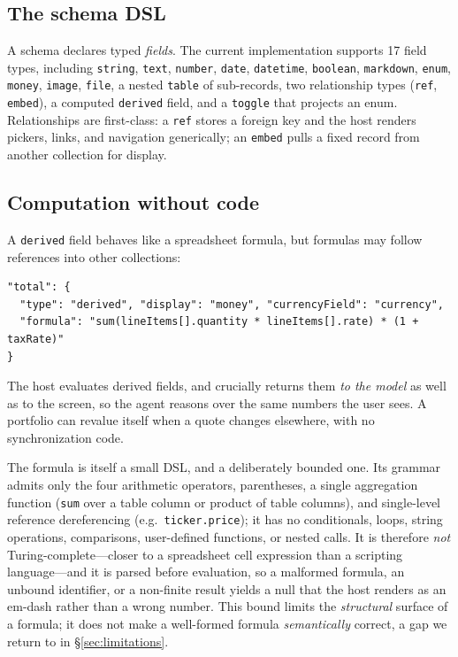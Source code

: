 \documentclass[11pt]{article}
\newcommand{\code}[1]{\texttt{\small #1}}
\begin{document}
\subsection{The schema DSL}
A schema declares typed \emph{fields}. The current implementation supports 17
field types, including \code{string}, \code{text}, \code{number}, \code{date},
\code{datetime}, \code{boolean}, \code{markdown}, \code{enum}, \code{money},
\code{image}, \code{file}, a nested \code{table} of sub-records, two relationship
types (\code{ref}, \code{embed}), a computed \code{derived} field, and a
\code{toggle} that projects an enum. Relationships are first-class: a \code{ref}
stores a foreign key and the host renders pickers, links, and navigation
generically; an \code{embed} pulls a fixed record from another collection for
display.

\subsection{Computation without code}
A \code{derived} field behaves like a spreadsheet formula, but formulas may follow
references into other collections:
\begin{lstlisting}
"total": {
  "type": "derived", "display": "money", "currencyField": "currency",
  "formula": "sum(lineItems[].quantity * lineItems[].rate) * (1 + taxRate)"
}
\end{lstlisting}
The host evaluates derived fields, and crucially returns them \emph{to the model}
as well as to the screen, so the agent reasons over the same numbers the user
sees. A portfolio can revalue itself when a quote changes elsewhere, with no
synchronization code.

The formula is itself a small DSL, and a deliberately bounded one. Its grammar
admits only the four arithmetic operators, parentheses, a single aggregation
function (\code{sum} over a table column or product of table columns), and
single-level reference dereferencing (e.g.\ \code{ticker.price}); it has no
conditionals, loops, string operations, comparisons, user-defined functions, or
nested calls. It is therefore \emph{not} Turing-complete---closer to a spreadsheet
cell expression than a scripting language---and it is parsed before evaluation, so
a malformed formula, an unbound identifier, or a non-finite result yields a null
that the host renders as an em-dash rather than a wrong number. This bound limits
the \emph{structural} surface of a formula; it does not make a well-formed formula
\emph{semantically} correct, a gap we return to in \S\ref{sec:limitations}.
\end{document}
